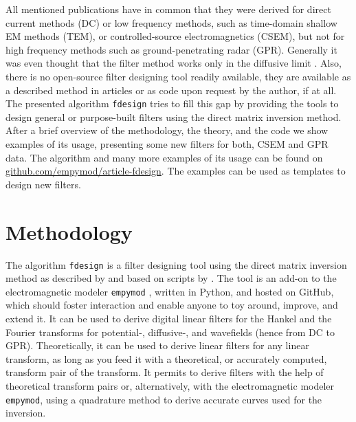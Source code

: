 \documentclass[paper,twocolumn,twoside]{geophysics}
\begin{document}

All mentioned publications have in common that they were derived for direct
current methods (DC) or low frequency methods, such as time-domain shallow EM
methods (TEM), or controlled-source electromagnetics (CSEM), but not for high
frequency methods such as ground-penetrating radar (GPR). Generally it was even
thought that the filter method works only in the diffusive limit
\citep[e.g.,][]{GEO.15.Hunziker}. Also, there is no open-source filter
designing tool readily available, they are available as a described method
in articles or as code upon request by the author, if at all. The presented
algorithm \texttt{fdesign} tries to fill this gap by providing the tools to
design general or purpose-built filters using the direct matrix inversion
method. After a brief overview of the methodology, the theory, and the code we
show examples of its usage, presenting some new filters for both, CSEM and GPR
data. The algorithm and many more examples of its usage can be found on
\href{https://github.com/empymod/article-fdesign}{github.com/empymod/article-fdesign}.
The examples can be used as templates to design new filters.


\section{Methodology}

The algorithm \texttt{fdesign} is a filter designing tool using the direct
matrix inversion method as described by \cite{GP.07.Kong} and based on scripts
by \cite{GEO.12.Key}. The tool is an add-on to the electromagnetic modeler
\texttt{empymod} \citep{GEO.17.Werthmuller}, written in Python, and hosted on
GitHub, which should foster interaction and enable anyone to toy around,
improve, and extend it. It can be used to derive digital linear filters for the
Hankel and the Fourier transforms for potential-, diffusive-, and wavefields
(hence from DC to GPR). Theoretically, it can be used to derive linear filters
for any linear transform, as long as you feed it with a theoretical, or
accurately computed, transform pair of the transform. It permits to derive
filters with the help of theoretical transform pairs or, alternatively, with
the electromagnetic modeler \texttt{empymod}, using a quadrature method to
derive accurate curves used for the inversion.
\end{document}
